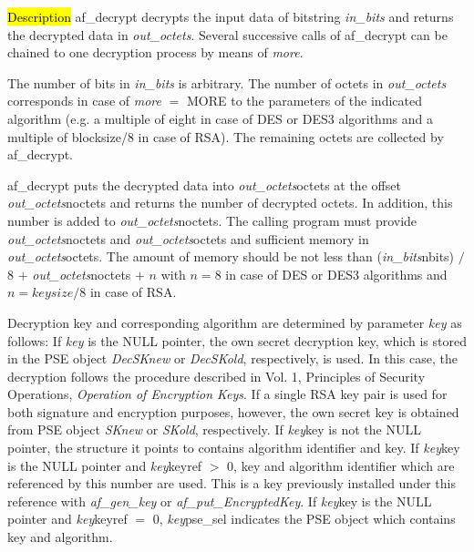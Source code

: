 


\hl{Description}
af\_decrypt decrypts the input data of bitstring {\em in\_bits} and returns the decrypted data
in {\em out\_octets}. Several successive calls of af\_decrypt can be chained
to one decryption process by means of {\em more}.

The number of bits in {\em in\_bits} is arbitrary. The number of octets in {\em out\_octets}
corresponds in case of {\em more} $=$ MORE to the parameters of the indicated algorithm
(e.g. a multiple of eight in case of DES or DES3 algorithms and a multiple of blocksize/8
in case of RSA). The remaining octets are collected by af\_decrypt.

af\_decrypt puts the decrypted data into {\em out\_octets}\pf octets at the offset
{\em out\_octets}\pf noctets and returns the number of decrypted octets. In addition, this number is added 
to {\em out\_octets}\pf noctets.
The calling program must provide {\em out\_octets}\pf noctets and {\em out\_octets}\pf octets and sufficient
memory in {\em out\_octets}\pf octets.
The amount of memory should be not less than
({\em in\_bits}\pf nbits) $/$ 8 $+$ {\em out\_octets}\pf noctets $+$ $n$ with $n = 8$ 
in case of DES or DES3 algorithms and $n = keysize / 8$ in case of RSA.

Decryption key and corresponding algorithm are determined by parameter {\em key} as follows:
\be
\m If {\em key} is the NULL pointer,
   the own secret decryption key, which is stored in the PSE object
   {\em DecSKnew} or {\em DecSKold}, respectively, is used. 
   In this case, the decryption follows
   the procedure described in Vol. 1, Principles of Security Operations, {\em Operation of
   Encryption Keys}.
   If a single RSA key pair is used for both signature and encryption purposes, however, the own secret key is
   obtained from PSE object {\em SKnew} or {\em SKold}, respectively.
\m If {\em key}\pf key is not the NULL pointer, the structure it points to
   contains algorithm identifier and key.
\m If {\em key}\pf key is the NULL pointer and {\em key}\pf keyref $>$ 0,
   key and algorithm identifier which are referenced by this number are used. This is a key
   previously installed under this reference with {\em af\_gen\_key} or 
   {\em af\_put\_EncryptedKey}.
\m If {\em key}\pf key is the NULL pointer and {\em key}\pf keyref $=$ 0,
   {\em key}\pf pse\_sel indicates the PSE object which contains key and algorithm.
\ee


